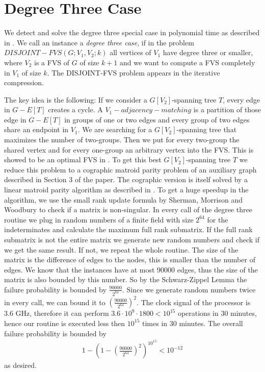 \documentclass[11pt,a4paper]{scrartcl}
\begin{document}
\section{Degree Three Case}

We detect and solve the degree three special case in polynomial time as described in \cite{DBLP:journals/corr/abs-1004-1672}. We call an instance a \textit{degree three case}, if in the problem $DISJOINT-FVS(G; V_1, V_2; k)$ all vertices of $V_1$ have degree three or smaller, where $V_2$ is a FVS of $G$ of size $k+1$ and we want to compute a FVS completely in $V_1$ of size $k$. The DISJOINT-FVS problem appears in the iterative compression.


The key idea is the following: If we consider a $G[V_2]$-spanning tree $T$, every edge in $G - E[T]$ creates a cycle. A $V_1-adjacency-matching$ is a partition of those edge in $G - E[T]$ in groups of one or two edges and every group of two edges share an endpoint in $V_1$. We are searching for a $G[V_2]$-spanning tree that maximizes the number of two-groups. Then we put for every two-group the shared vertex and for every one-group an arbitrary vertex into the FVS. This is showed to be an optimal FVS in \cite{DBLP:journals/corr/abs-1004-1672}. To get this best $G[V_2]$-spanning tree $T$ we reduce this problem to a cographic matroid parity problem of an auxiliary graph described in Section 3 of the paper. The cographic version is itself solved by a linear matroid parity algorithm as described in \cite{Cheung:2014:AAL:2620785.2601066}. To get a huge speedup in the algorithm, we use the small rank update formula by Sherman, Morrison and Woodbury to check if a matrix is non-singular.
In every call of the degree three routine we plug in random numbers of a finite field with size $2^{64}$ for the indeterminates and calculate the maximum full rank submatrix. If the full rank submatrix is not the entire matrix we generate new random numbers and check if we get the same result. If not, we repeat the whole routine. The size of the matrix is the difference of edges to the nodes, this is smaller than the number of edges. We know that the instances have at most 90000 edges, thus the size of the matrix is also bounded by this number. So by the Schwarz-Zippel Lemma the failure probability is bounded by $\frac{90000}{2^{64}}$. Since we generate random numbers twice in every call, we can bound it to $(\frac{90000}{2^{64}})^2$. The clock signal of the processor is 3.6 GHz, therefore it can perform $3.6\cdot 10^9\cdot 1800<10^{15}$ operations in 30 minutes, hence our routine is executed less then $10^{15}$ times in 30 minutes. The overall failure probability is bounded by
\begin{align*}
1-\left(1-\left(\frac{90000}{2^{64}}\right)^2\right)^{10^{15}}<10^{-12}
\end{align*}
as desired.

\nocite{bafna1999}
\nocite{chen2008}


\end{document}
